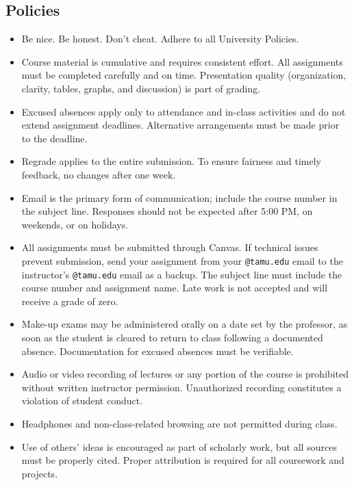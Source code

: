 \documentclass[10pt]{article}
\begin{document}
\subsection*{Policies}
\begin{itemize}[leftmargin=*,nosep]
\item Be nice. Be honest. Don’t cheat. Adhere to all University Policies.
\item Course material is cumulative and requires consistent effort.
      All assignments must be completed carefully and on time.
      Presentation quality (organization, clarity, tables, graphs, and discussion) is part of grading.
\item Excused absences apply only to attendance and in-class activities and do not extend assignment deadlines.
      Alternative arrangements must be made prior to the deadline.
\item Regrade applies to the entire submission.
      To ensure fairness and timely feedback, no changes after one week.
\item Email is the primary form of communication; include the course number in the subject line.
      Responses should not be expected after 5:00 PM, on weekends, or on holidays.
\item All assignments must be submitted through Canvas.
      If technical issues prevent submission, send your assignment from your \texttt{@tamu.edu} email to the instructor’s \texttt{@tamu.edu} email as a backup.
      The subject line must include the course number and assignment name.
      Late work is not accepted and will receive a grade of zero.
\item Make-up exams may be administered orally on a date set by the professor, as soon as the student is cleared to return to class following a documented absence.
      Documentation for excused absences must be verifiable.
\item Audio or video recording of lectures or any portion of the course is prohibited without written instructor permission. Unauthorized recording constitutes a violation of student conduct.
\item Headphones and non-class-related browsing are not permitted during class.
\item Use of others’ ideas is encouraged as part of scholarly work, but all sources must be properly cited. Proper attribution is required for all coursework and projects.
\end{itemize}
\end{document}
